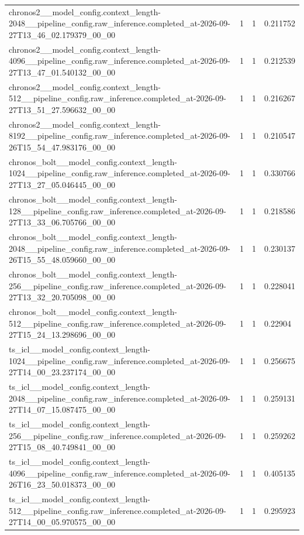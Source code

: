 \begin{tabular}{llll}
chronos2\_\_model\_config.context\_length-2048\_\_pipeline\_config.raw\_inference.completed\_at-2026-09-27T13\_46\_02.179379\_00\_00 & 1 & 1 & 0.211752 \\
chronos2\_\_model\_config.context\_length-4096\_\_pipeline\_config.raw\_inference.completed\_at-2026-09-27T13\_47\_01.540132\_00\_00 & 1 & 1 & 0.212539 \\
chronos2\_\_model\_config.context\_length-512\_\_pipeline\_config.raw\_inference.completed\_at-2026-09-27T13\_51\_27.596632\_00\_00 & 1 & 1 & 0.216267 \\
chronos2\_\_model\_config.context\_length-8192\_\_pipeline\_config.raw\_inference.completed\_at-2026-09-26T15\_54\_47.983176\_00\_00 & 1 & 1 & 0.210547 \\
chronos\_bolt\_\_model\_config.context\_length-1024\_\_pipeline\_config.raw\_inference.completed\_at-2026-09-27T13\_27\_05.046445\_00\_00 & 1 & 1 & 0.330766 \\
chronos\_bolt\_\_model\_config.context\_length-128\_\_pipeline\_config.raw\_inference.completed\_at-2026-09-27T13\_33\_06.705766\_00\_00 & 1 & 1 & 0.218586 \\
chronos\_bolt\_\_model\_config.context\_length-2048\_\_pipeline\_config.raw\_inference.completed\_at-2026-09-26T15\_55\_48.059660\_00\_00 & 1 & 1 & 0.230137 \\
chronos\_bolt\_\_model\_config.context\_length-256\_\_pipeline\_config.raw\_inference.completed\_at-2026-09-27T13\_32\_20.705098\_00\_00 & 1 & 1 & 0.228041 \\
chronos\_bolt\_\_model\_config.context\_length-512\_\_pipeline\_config.raw\_inference.completed\_at-2026-09-27T15\_24\_13.298696\_00\_00 & 1 & 1 & 0.22904 \\
ts\_icl\_\_model\_config.context\_length-1024\_\_pipeline\_config.raw\_inference.completed\_at-2026-09-27T14\_00\_23.237174\_00\_00 & 1 & 1 & 0.256675 \\
ts\_icl\_\_model\_config.context\_length-2048\_\_pipeline\_config.raw\_inference.completed\_at-2026-09-27T14\_07\_15.087475\_00\_00 & 1 & 1 & 0.259131 \\
ts\_icl\_\_model\_config.context\_length-256\_\_pipeline\_config.raw\_inference.completed\_at-2026-09-27T15\_08\_40.749841\_00\_00 & 1 & 1 & 0.259262 \\
ts\_icl\_\_model\_config.context\_length-4096\_\_pipeline\_config.raw\_inference.completed\_at-2026-09-26T16\_23\_50.018373\_00\_00 & 1 & 1 & 0.405135 \\
ts\_icl\_\_model\_config.context\_length-512\_\_pipeline\_config.raw\_inference.completed\_at-2026-09-27T14\_00\_05.970575\_00\_00 & 1 & 1 & 0.295923 \\

\end{tabular}
